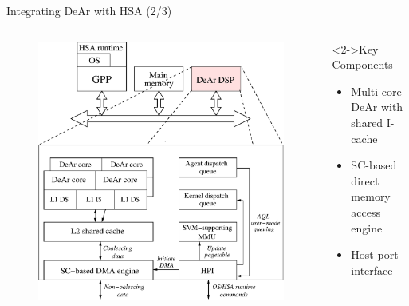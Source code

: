 \documentclass{beamer}
\begin{document}
\begin{CJK}{UTF8}{bkai}
            \begin{frame}{Integrating DeAr with HSA (2/3)}
                \begin{columns}
                    \begin{column}{0.6\textwidth}
                        \vspace{-1em}
                        \begin{figure}[!ht] 
                            \centering
                            \includegraphics[width=1.0\textwidth]{./figs/archi.eps}
                            \label{fig:archi}
                        \end{figure}
                    \end{column}
                    \begin{column}{0.40\textwidth}
                        \begin{block}<2->{Key Components}
                            \begin{itemize}
                                \item <3->{Multi-core DeAr with shared I-cache}
                                \item <4->{SC-based direct memory access engine}
                                \item <5->{Host port interface}
                            \end{itemize}
                        \end{block}
                    \end{column}
                \end{columns}
            \end{frame}


\end{CJK}
\end{document}
